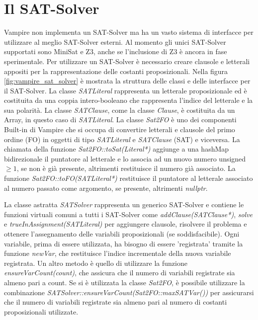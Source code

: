 \documentclass[./main.tex]{subfiles}
\begin{document}
\section{Il SAT-Solver} \label{sec:vampire_sat}
Vampire non implementa un SAT-Solver ma ha un vasto sistema di interfacce per utilizzare al meglio SAT-Solver esterni.
Al momento gli unici SAT-Solver supportati sono MiniSat e Z3, anche se l'inclusione di Z3 è ancora in fase sperimentale.
Per utilizzare un SAT-Solver è necessario creare clausole e letterali appositi per la rappresentazione delle costanti proposizionali.
Nella figura \ref{fig:vampire_sat_solver} è mostrata la struttura delle classi e delle interfacce per il SAT-Solver.
La classe \textit{SATLiteral} rappresenta un letterale proposizionale ed è costituita da una coppia intero-booleano che rappresenta
l'indice del letterale e la sua polarità. 
La classe \textit{SATClause}, come la classe \textit{Clause}, è costituita da un Array, in questo caso di \textit{SATLiteral}.
La classe \textit{Sat2FO} è uno dei componenti Built-in di Vampire che si occupa di convertire letterali e clausole 
del primo ordine (FO) in oggetti di tipo \textit{SATLiteral} e \textit{SATClause} (SAT) e viceversa. 
La chiamata della funzione \textit{Sat2FO::toSat(Literal*)} aggiunge a una hashMap bidirezionale il puntatore al letterale
e lo associa ad un nuovo numero unsigned $\geq 1$, se non è già presente, altrimenti restituisce il numero già associato.
La funzione \textit{Sat2FO::toFO(SATLiteral*)} restituisce il puntatore al letterale associato al numero passato come argomento,
se presente, altrimenti \textit{nullptr}.

La classe astratta \textit{SATSolver} rappresenta un generico SAT-Solver e contiene le funzioni virtuali comuni a tutti i SAT-Solver 
come \textit{addClause(SATClause*)}, \textit{solve} e \textit{trueInAssignment(SATLiteral)} per 
aggiungere clausole, risolvere il problema e ottenere l'assegnamento delle variabili proposizionali (se soddisfacibile). 
Ogni variabile, prima di essere utilizzata, ha bisogno di essere 'registrata' tramite la funzione \textit{newVar}, che restituisce
l'indice incrementale della nuova variabile registrata. Un altro metodo è quello di utilizzare la funzione \textit{ensureVarCount(count)}, che 
assicura che il numero di variabili registrate sia almeno pari a count.
Se si è utilizzata la classe \textit{Sat2FO}, è possibile utilizzare la combinazione \textit{SATSolver::ensureVarCount(Sat2FO::maxSATVar())}
per assicurarsi che il numero di variabili registrate sia almeno pari al numero di costanti proposizionali utilizzate.
\end{document}
